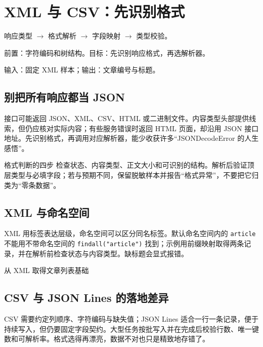 \chapter{XML 与 CSV：先识别格式}\label{ch:formats}
\begin{tcolorbox}[title=章首知识地图,colframe=Ink]
响应类型 $\longrightarrow$ 格式解析 $\longrightarrow$ 字段映射 $\longrightarrow$ 类型校验。
\end{tcolorbox}

\begin{tcolorbox}[title=学习目标与前置知识,colframe=Ink!65,colback=Ink!2]
前置：字符编码和树结构。目标：先识别响应格式，再选解析器。\par
输入：固定 XML 样本；输出：文章编号与标题。
\end{tcolorbox}

\section{别把所有响应都当 JSON}
接口可能返回 JSON、XML、CSV、HTML 或二进制文件。内容类型头部提供线索，但仍应核对实际内容；有些服务错误时返回 HTML 页面，却沿用 JSON 接口地址。先识别格式，再调用对应解析器，能少收获许多“JSONDecodeError 的人生感悟”。

\begin{method}{格式判断的四步}
检查状态、内容类型、正文大小和可识别的结构。解析后验证顶层类型与必填字段；若与预期不同，保留脱敏样本并报告“格式异常”，不要把它归类为“零条数据”。
\end{method}

\section{XML 与命名空间}
XML 用标签表达层级，命名空间可以区分同名标签。默认命名空间内的 \texttt{article} 不能用不带命名空间的 \texttt{findall("article")} 找到；示例用前缀映射取得两条记录，并在解析前检查状态与内容类型。缺标题会显式报错。

\begin{example}{从 XML 取得文章列表}{基础}
\end{example}

\section{CSV 与 JSON Lines 的落地差异}
CSV 需要约定列顺序、字符编码与缺失值；JSON Lines 适合一行一条记录，便于持续写入，但仍要固定字段契约。大型任务按批写入并在完成后校验行数、唯一键数和可解析率。格式选得再漂亮，数据不对也只是精致地存错了。

